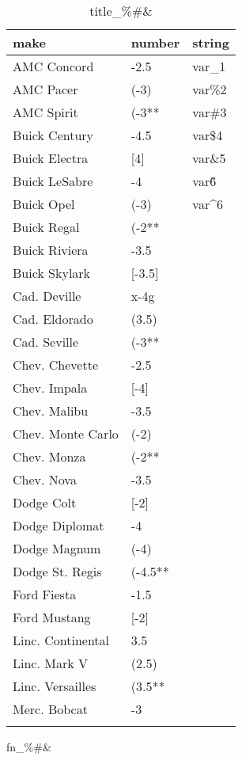 \documentclass{article}
\begin{document}
\begin{table}[tbp] \centering
{}

\caption{title\_\%\#\&}
\begin{tabularx}{\linewidth}{@{}lCC@{}}

\toprule
{make}&{number}&{string} \tabularnewline
\midrule \addlinespace[\belowrulesep]
AMC Concord&-2.5&var\_1 \tabularnewline
AMC Pacer&(-3)&var\%2 \tabularnewline
AMC Spirit&(-3**&var\#3 \tabularnewline
Buick Century&-4.5&var\$4 \tabularnewline
Buick Electra&[4]&var\&5 \tabularnewline
Buick LeSabre&-4&var\~6 \tabularnewline
Buick Opel&(-3)&var\^{}6 \tabularnewline
Buick Regal&(-2**& \tabularnewline
Buick Riviera&-3.5& \tabularnewline
Buick Skylark&[-3.5]& \tabularnewline
Cad. Deville&x-4g& \tabularnewline
Cad. Eldorado&(3.5)& \tabularnewline
Cad. Seville&(-3**& \tabularnewline
Chev. Chevette&-2.5& \tabularnewline
Chev. Impala&[-4]& \tabularnewline
Chev. Malibu&-3.5& \tabularnewline
Chev. Monte Carlo&(-2)& \tabularnewline
Chev. Monza&(-2**& \tabularnewline
Chev. Nova&-3.5& \tabularnewline
Dodge Colt&[-2]& \tabularnewline
Dodge Diplomat&-4& \tabularnewline
Dodge Magnum&(-4)& \tabularnewline
Dodge St. Regis&(-4.5**& \tabularnewline
Ford Fiesta&-1.5& \tabularnewline
Ford Mustang&[-2]& \tabularnewline
Linc. Continental&3.5& \tabularnewline
Linc. Mark V&(2.5)& \tabularnewline
Linc. Versailles&(3.5**& \tabularnewline
Merc. Bobcat&-3& \tabularnewline
\bottomrule \addlinespace[\belowrulesep]

\end{tabularx}
\parbox{\linewidth}{\footnotesize fn\_\%\#\&}
\end{table}
\end{document}
